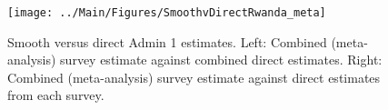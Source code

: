 \documentclass[12pt]{article}\usepackage[]{graphicx}\usepackage[]{color}
\newenvironment{knitrout}{}{} %
\begin{document}



\begin{knitrout}
\color{fgcolor}\begin{figure}[bht]

{\centering \texttt{[image: ../Main/Figures/SmoothvDirectRwanda\_meta]} 

}

\caption[Smooth versus direct Admin 1 estimates]{Smooth versus direct Admin 1 estimates. Left: Combined (meta-analysis) survey estimate against combined direct estimates. Right: Combined (meta-analysis) survey estimate against direct estimates from each survey.}\label{fig:unnamed-chunk-273}
\end{figure}


\end{knitrout}
\end{document}
